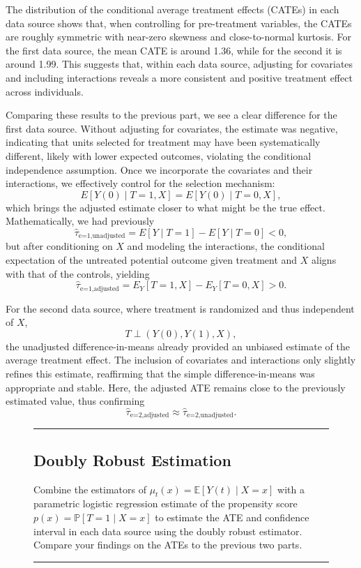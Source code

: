 \documentclass{article}
\newenvironment{colorparagraph}[1]{\par\color{#1}}{\par}
\begin{document}
The distribution of the conditional average treatment effects (CATEs) in each data source shows that, when controlling for pre-treatment variables, the CATEs are roughly symmetric with near-zero skewness and close-to-normal kurtosis. For the first data source, the mean CATE is around 1.36, while for the second it is around 1.99. This suggests that, within each data source, adjusting for covariates and including interactions reveals a more consistent and positive treatment effect across individuals.

Comparing these results to the previous part, we see a clear difference for the first data source. Without adjusting for covariates, the estimate was negative, indicating that units selected for treatment may have been systematically different, likely with lower expected outcomes, violating the conditional independence assumption. Once we incorporate the covariates and their interactions, we effectively control for the selection mechanism:
\[
E[Y(0) \mid T=1,X] = E[Y(0) \mid T=0,X],
\]
which brings the adjusted estimate closer to what might be the true effect. Mathematically, we had previously
\[
\widehat{\tau}_{\text{e=1,unadjusted}} = E[Y \mid T=1] - E[Y \mid T=0] < 0,
\]
but after conditioning on \( X \) and modeling the interactions, the conditional expectation of the untreated potential outcome given treatment and \( X \) aligns with that of the controls, yielding
\[
\widehat{\tau}_{\text{e=1,adjusted}} = E_Y[T=1,X]-E_Y[T=0,X] > 0.
\]

For the second data source, where treatment is randomized and thus independent of \( X \),
\[
T \perp (Y(0), Y(1), X),
\]
the unadjusted difference-in-means already provided an unbiased estimate of the average treatment effect. The inclusion of covariates and interactions only slightly refines this estimate, reaffirming that the simple difference-in-means was appropriate and stable. Here, the adjusted ATE remains close to the previously estimated value, thus confirming
\[
\widehat{\tau}_{\text{e=2,adjusted}} \approx \widehat{\tau}_{\text{e=2,unadjusted}}.
\]

\begin{figure}[H]
  \begin{colorparagraph}{questioncolor}
  \rule{\textwidth}{0.5pt}
  \label{q3c}
  \subsection{Doubly Robust Estimation}

  Combine the estimators of \( \mu_t(x) = \mathbb{E}[Y(t) \mid X = x] \) with a parametric logistic regression estimate of the propensity score \( p(x) = \mathbb{P}[T = 1 \mid X = x] \) to estimate the ATE and confidence interval in each data source using the doubly robust estimator. Compare your findings on the ATEs to the previous two parts.

  \rule{\textwidth}{0.5pt}
  \end{colorparagraph}
\end{figure}
\end{document}
